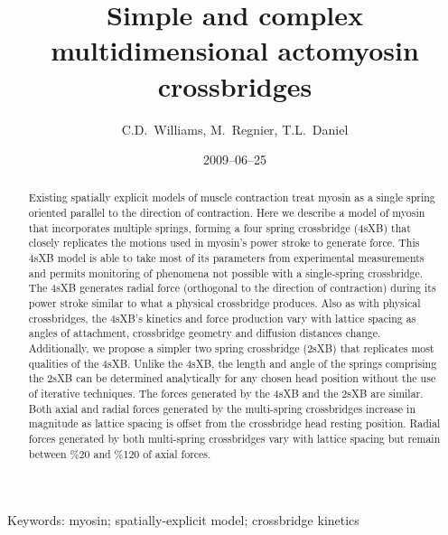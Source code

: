 \documentclass[]{article}
\title{Simple and complex multidimensional actomyosin crossbridges}
\author{C.D.\ Williams, M.\ Regnier, T.L.\ Daniel}
\date{2009--06--25}
\begin{document}
\maketitle{}

\begin{abstract} 
Existing spatially explicit models of muscle contraction treat myosin as a single spring oriented parallel to the direction of contraction.
Here we describe a model of myosin that incorporates multiple springs, forming a four spring crossbridge (4sXB) that closely replicates the motions used in myosin's power stroke to generate force.
This 4sXB model is able to take most of its parameters from experimental measurements and permits monitoring of phenomena not possible with a single-spring crossbridge.
The 4sXB generates radial force (orthogonal to the direction of contraction) during its power stroke similar to what a physical crossbridge produces.
Also as with physical crossbridges, the 4sXB's kinetics and force production vary with lattice spacing as angles of attachment, crossbridge geometry and diffusion distances change.
Additionally, we propose a simpler two spring crossbridge (2sXB) that replicates most qualities of the 4sXB.
Unlike the 4sXB, the length and angle of the springs comprising the 2sXB can be determined analytically for any chosen head position without the use of iterative techniques.
The forces generated by the 4sXB and the 2sXB are similar.
Both axial and radial forces generated by the multi-spring crossbridges increase in magnitude as lattice spacing is offset from the crossbridge head resting position.
Radial forces generated by both multi-spring crossbridges vary with lattice spacing but remain between \%20 and \%120 of axial forces.
\end{abstract}

Keywords: myosin; spatially-explicit model; crossbridge kinetics

\end{document}
